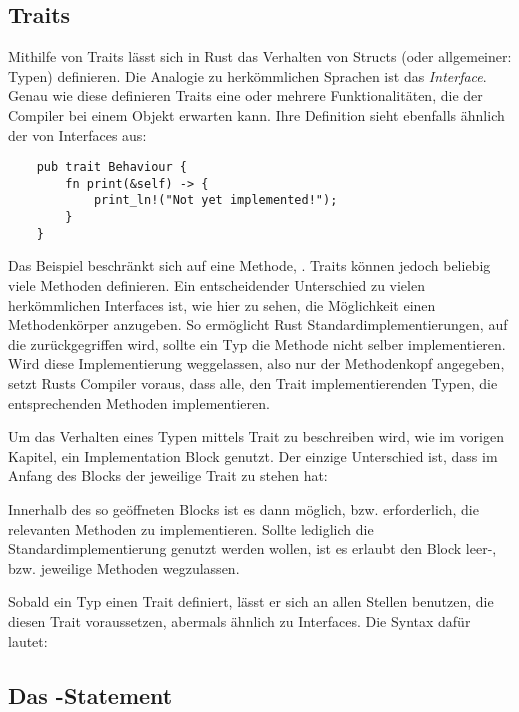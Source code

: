 \subsection{Traits}\label{chap:traits}

Mithilfe von Traits lässt sich in Rust das Verhalten von Structs (oder allgemeiner: Typen) definieren. Die Analogie zu herkömmlichen Sprachen ist das \textit{Interface}. Genau wie diese definieren Traits eine oder mehrere Funktionalitäten, die der Compiler bei einem Objekt erwarten kann. Ihre Definition sieht ebenfalls ähnlich der von Interfaces aus:

\begin{verbatim}
    pub trait Behaviour {
        fn print(&self) -> {
            print_ln!("Not yet implemented!");
        }
    }
\end{verbatim}


Das Beispiel beschränkt sich auf eine Methode, . Traits können jedoch beliebig viele Methoden definieren. Ein entscheidender Unterschied zu vielen herkömmlichen Interfaces ist, wie hier zu sehen, die Möglichkeit einen Methodenkörper anzugeben. So ermöglicht Rust Standardimplementierungen, auf die zurückgegriffen wird, sollte ein Typ die Methode nicht selber implementieren. Wird diese Implementierung weggelassen, also nur der Methodenkopf angegeben, setzt Rusts Compiler voraus, dass alle, den Trait implementierenden Typen, die entsprechenden Methoden implementieren.

Um das Verhalten eines Typen mittels Trait zu beschreiben wird, wie im vorigen Kapitel, ein Implementation Block genutzt. Der einzige Unterschied ist, dass im Anfang des Blocks der jeweilige Trait zu stehen hat:

\qquad{}

Innerhalb des so geöffneten Blocks ist es dann möglich, bzw. erforderlich, die relevanten Methoden zu implementieren. Sollte lediglich die Standardimplementierung genutzt werden wollen, ist es erlaubt den Block leer-, bzw. jeweilige Methoden wegzulassen.

Sobald ein Typ einen Trait definiert, lässt er sich an allen Stellen benutzen, die diesen Trait voraussetzen, abermals ähnlich zu Interfaces. Die Syntax dafür lautet: 

\qquad{}

\subsection{Das -Statement}

